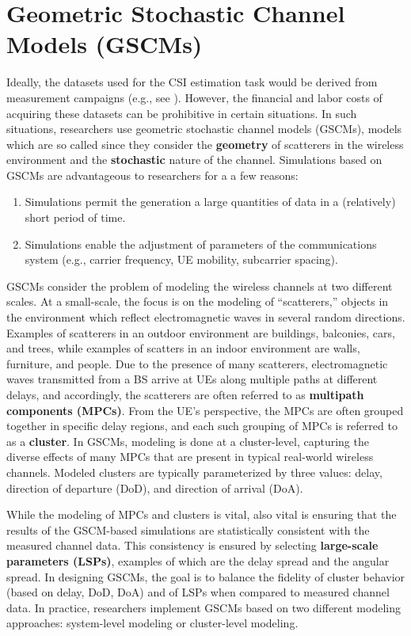 \section{Geometric Stochastic Channel Models (GSCMs)}
\label{sect:channel_model}

Ideally, the datasets used for the CSI estimation task would be derived from measurement campaigns (e.g., see \cite{ref:shepard2016argoschannel,ref:du2021interuserangle,ref:li20222finegrained}). However, the financial and labor costs of acquiring these datasets can be prohibitive in certain situations. In such situations, researchers use geometric stochastic channel models (GSCMs), models which are so called since they consider the \textbf{geometry} of scatterers in the wireless environment and the \textbf{stochastic} nature of the channel. Simulations based on GSCMs are advantageous to researchers for a a few reasons:
\begin{enumerate}
	\item Simulations permit the generation a large quantities of data in a (relatively) short period of time.
	\item Simulations enable the adjustment of parameters of the communications system (e.g., carrier frequency, UE mobility, subcarrier spacing).
\end{enumerate}

GSCMs consider the problem of modeling the wireless channels at two different scales. At a small-scale, the focus is on the modeling of ``scatterers,'' objects in the environment which reflect electromagnetic waves in several random directions. Examples of scatterers in an outdoor environment are buildings, balconies, cars, and trees, while examples of scatters in an indoor environment are walls, furniture, and people. Due to the presence of many scatterers, electromagnetic waves transmitted from a BS arrive at UEs along multiple paths at different delays, and accordingly, the scatterers are often referred to as \textbf{multipath components (MPCs)}. From the UE's perspective, the MPCs are often grouped together in specific delay regions, and each such grouping of MPCs is referred to as a \textbf{cluster}. In GSCMs, modeling is done at a cluster-level, capturing the diverse effects of many MPCs that are present in typical real-world wireless channels. Modeled clusters are typically parameterized by three values: delay, direction of departure (DoD), and direction of arrival (DoA).  

While the modeling of MPCs and clusters is vital, also vital is ensuring that the results of the GSCM-based simulations are statistically consistent with the measured channel data. This consistency is ensured by selecting \textbf{large-scale parameters (LSPs)}, examples of which are the delay spread and the angular spread. In designing GSCMs, the goal is to balance the fidelity of cluster behavior (based on delay, DoD, DoA) and of LSPs when compared to measured channel data. In practice, researchers implement GSCMs based on two different modeling approaches: system-level modeling or cluster-level modeling.

